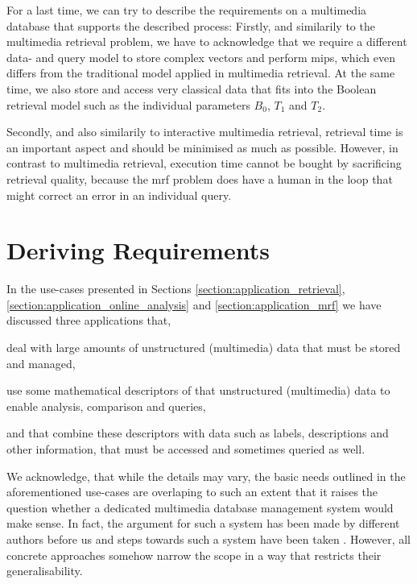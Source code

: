 For a last time, we can try to describe the requirements on a multimedia database that supports the described process: Firstly, and similarily to the multimedia retrieval problem, we have to acknowledge that we require a different data- and query model to store complex vectors and perform \acrshort{mips}, which even differs from the traditional model applied in multimedia retrieval. At the same time, we also store and access very classical data that fits into the Boolean retrieval model such as the individual parameters $B_0$, $T_1$ and $T_2$. 

Secondly, and also similarily to interactive multimedia retrieval, retrieval time is an important aspect and should be minimised as much as possible. However, in contrast to multimedia retrieval, execution time cannot be bought by sacrificing retrieval quality, because the \acrshort{mrf} problem does have a human in the loop that might correct an error in an individual query.

\section{Deriving Requirements}
In the use-cases presented in Sections \ref{section:application_retrieval}, \ref{section:application_online_analysis} and \ref{section:application_mrf} we have discussed three applications that, 
\begin{enumerate*}[label=(\roman*)]
    \item deal with large amounts of unstructured (multimedia) data that must be stored and managed,
    \item use some mathematical descriptors of that unstructured (multimedia) data to enable analysis, comparison and queries,
    \item and that combine these descriptors with data such as labels, descriptions and other information, that must be accessed and sometimes queried as well.
\end{enumerate*}

We acknowledge, that while the details may vary, the basic needs outlined in the aforementioned use-cases are overlaping to such an extent that it raises the question whether a dedicated multimedia database management system would make sense. In fact, the argument for such a system has been made by different authors before us \cite{Smeulders:2000Content,Zahalka:2014towards,Jonson:2016} and steps towards such a system have been taken \cite{Giangreco:2018Database,Wang:2021Milvus}. However, all concrete approaches somehow narrow the scope in a way that restricts their generalisability.

